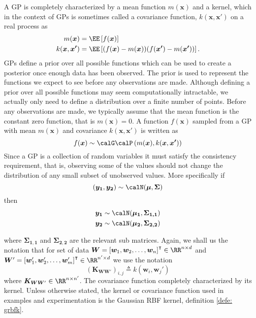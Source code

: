 A GP is completely characterized by a mean function $m(\bm{x})$ and a kernel, which in the context of GPs is sometimes called a covariance function, $k (\bm{x}, \bm{x'})$ on a real process as
\begin{align*}
    m(\bm{x})           & = \EE \left[ f(\bm{x}) \right]                                          \\
    k (\bm{x}, \bm{x'}) & = \EE \left[ (f(\bm{x}) - m(\bm{x})) (f(\bm{x'}) - m(\bm{x'})) \right].
\end{align*}
GPs define a prior over all possible functions which can be used to create a posterior once enough data has been observed. The prior is used to represent the functions we expect to see before any observations are made. Although defining a prior over all possible functions may seem computationally intractable, we actually only need to define a distribution over a finite number of points. Before any observations are made, we typically assume that the mean function is the constant zero function, that is $m \left( \bm{x} \right) = 0$. A function $f(\bm{x})$ sampled from a GP with mean $m(\bm{x})$ and covariance $k (\bm{x}, \bm{x'})$ is written as
\[
    f(\bm{x}) \sim \calG \calP \left( m(\bm{x}), k (\bm{x}, \bm{x'}) \right)
\]
Since a GP is a collection of random variables it must satisfy the consistency requirement, that is, observing some of the values should not change the distribution of any small subset of unobserved values. More specifically if
\[
    (\bm{y_1}, \bm{y_2}) \sim \calN (\bm{\mu}, \bm{\Sigma})
\]
then
\begin{align*}
    \bm{y_1} & \sim \calN (\bm{\mu_1}, \bm{\Sigma_{1,1}}) \\
    \bm{y_2} & \sim \calN (\bm{\mu_2}, \bm{\Sigma_{2,2}})
\end{align*}

where $\bm{\Sigma_{1,1}}$ and $\bm{\Sigma_{2,2}}$ are the relevant sub matrices. Again, we shall us the notation that for set of data $\bm{W} = \left[ \bm{w}_1 ,\bm{w}_2 , \ldots , \bm{w}_n \right]^{\intercal} \in \RR^{n \times d}$ and $\bm{W}' = \left[ \bm{w}_1' ,\bm{w}_2' , \ldots , \bm{w}_m' \right]^{\intercal} \in \RR^{n' \times d}$ we use the notation
\[
    \left( \bm{K}_{\bm{W} \bm{W}'} \right)_{i,j} \triangleq k \left( \bm{w}_i , \bm{w}_j' \right)
\]
where \( \bm{K}_{\bm{W} \bm{W}'} \in \RR^{n \times n'} \). The covariance function completely characterized by its kernel. Unless otherwise stated, the kernel or covariance function used in examples and experimentation is the Gaussian RBF kernel, definition \ref{defe: grbfk}.

